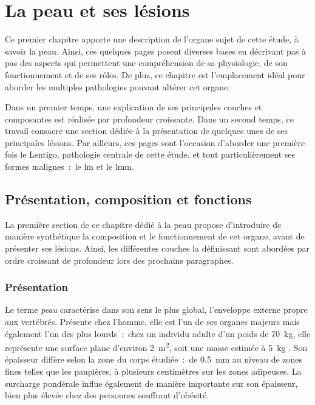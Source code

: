 \renewcommand{\thechapter}{\arabic{chapter}}
\setcounter{chapter}{0}

\chapter{La peau et ses lésions}
\label{chap:chapter_1}
\chapterintro
Ce premier chapitre apporte une description de l'organe sujet de cette étude, à savoir la peau. Ainsi, ces quelques pages posent diverses bases en décrivant pas à pas des aspects qui permettent une compréhension de sa physiologie, de son fonctionnement et de ses rôles. De plus, ce chapitre est l'emplacement idéal pour aborder les multiples pathologies pouvant altérer cet organe.\par

Dans un premier temps, une explication de ses principales couches et composantes est réalisée par profondeur croissante. Dans un second temps, ce travail consacre une section dédiée à la présentation de quelques unes de ses principales lésions. Par ailleurs, ces pages sont l'occasion d'aborder une première fois le Lentigo, pathologie centrale de cette étude, et tout particulièrement ses formes malignes~:~le \acrlong{lm} et le \acrlong{lmm}.\par
\newpage

\section{Présentation, composition et fonctions}
La première section de ce chapitre dédié à la peau propose d'introduire de manière synthétique la composition et le fonctionnement de cet organe, avant de présenter ses lésions. Ainsi, les différentes couches la définissant sont abordées par ordre croissant de profondeur lors des prochains paragraphes.\par

\subsection{Présentation}
Le terme \textit{peau} caractérise dans son sens le plus global, l’enveloppe externe propre aux vertébrés. Présente chez l’homme, elle est l’un de ses organes majeurs mais également l’un des plus lourds~:~chez un individu adulte d’un poids de \SI{70}{\kilo\gram}, elle représente une surface plane d’environ \SI{2}{\metre\squared}, soit une masse estimée à \SI{5}{\kilo\gram} \cite{McGrath2010}. Son épaisseur diffère selon la zone du corps étudiée~:~de \SI{0,5}{\milli\metre} au niveau de zones fines telles que les paupières, à plusieurs centimètres sur les zones adipeuses. La surcharge pondérale influe également de manière importante sur son épaisseur, bien plus élevée chez des personnes souffrant d'obésité.\par

